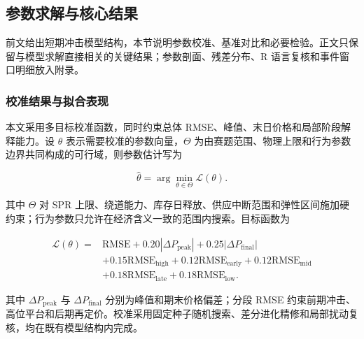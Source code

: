 \subsection{参数求解与核心结果}

前文给出短期冲击模型结构，本节说明参数校准、基准对比和必要检验。正文只保留与模型求解直接相关的关键结果；参数剖面、残差分布、R 语言复核和事件窗口明细放入附录。

\subsubsection{校准结果与拟合表现}

本文采用多目标校准函数，同时约束总体 RMSE、峰值、末日价格和局部阶段解释能力。设 \(\theta\) 表示需要校准的参数向量，\(\Theta\) 为由赛题范围、物理上限和行为参数边界共同构成的可行域，则参数估计写为

\begin{equation}
  \hat\theta=\arg\min_{\theta\in\Theta}\mathcal L(\theta).
\end{equation}

其中 \(\Theta\) 对 SPR 上限、绕道能力、库存日释放、供应中断范围和弹性区间施加硬约束；行为参数只允许在经济含义一致的范围内搜索。目标函数为

\begin{equation}
\begin{aligned}
\mathcal L(\theta)={}&
\mathrm{RMSE}
+0.20|\Delta P_{\mathrm{peak}}|
+0.25|\Delta P_{\mathrm{final}}| \\
&+0.15\mathrm{RMSE}_{\mathrm{high}}
+0.12\mathrm{RMSE}_{\mathrm{early}}
+0.12\mathrm{RMSE}_{\mathrm{mid}} \\
&+0.18\mathrm{RMSE}_{\mathrm{late}}
+0.18\mathrm{RMSE}_{\mathrm{low}} .
\end{aligned}
\end{equation}

其中 \(\Delta P_{\mathrm{peak}}\) 与 \(\Delta P_{\mathrm{final}}\) 分别为峰值和期末价格偏差；分段 RMSE 约束前期冲击、高位平台和后期再定价。校准采用固定种子随机搜索、差分进化精修和局部扰动复核，均在既有模型结构内完成。

